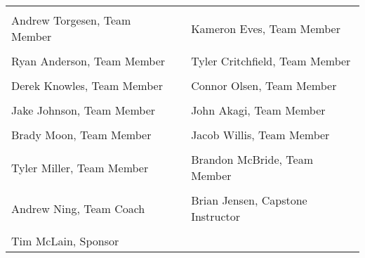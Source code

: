\documentclass[]{auvsi_doc}
\newcommand{\spaceheight}{3pt}
\newcommand{\nameheight}{-7pt}
\begin{document}
\begin{AUVSITitlePage}
\begin{tabu}{@{}p{7cm}p{1cm}p{7cm}@{}}
\hrulefill & & \hrulefill \\[\nameheight]
\rowfont{\tiny}
Andrew Torgesen, Team Member & & Kameron Eves, Team Member\\[\spaceheight]
\hrulefill & & \hrulefill \\[\nameheight]
\rowfont{\tiny}
Ryan Anderson, Team Member & & Tyler Critchfield, Team Member\\[\spaceheight]
\hrulefill & & \hrulefill \\[\nameheight]
\rowfont{\tiny}
Derek Knowles, Team Member & & Connor Olsen, Team Member\\[\spaceheight]
\hrulefill & & \hrulefill \\[\nameheight]
\rowfont{\tiny}
Jake Johnson, Team Member & & John Akagi, Team Member\\[\spaceheight]
\hrulefill & & \hrulefill \\[\nameheight]
\rowfont{\tiny}
Brady Moon, Team Member & & Jacob Willis, Team Member\\[\spaceheight]
\hrulefill & & \hrulefill \\[\nameheight]
\rowfont{\tiny}
Tyler Miller, Team Member & & Brandon McBride, Team Member\\[\spaceheight]
\hrulefill & & \hrulefill \\[\nameheight]
\rowfont{\tiny}
Andrew Ning, Team Coach & & Brian Jensen, Capstone Instructor\\[\spaceheight]
\hrulefill & & \\[\nameheight]
\rowfont{\tiny}
Tim McLain, Sponsor & & \\
\end{tabu}
\end{AUVSITitlePage}

\AUVSITableOfContents







\end{document}
